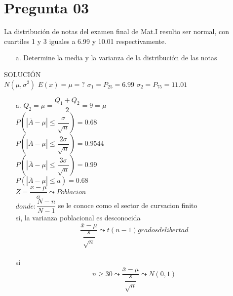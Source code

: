 \documentclass[10pt,a4paper]{article}
\begin{document}
\section{Pregunta 03}
La distribución de notas del examen final de Mat.I resulto ser normal, con cuartiles 1 y 3 iguales a 6.99 y 10.01 respectivamente.\\
\begin{itemize}
\item[a.]Determine la media y la varianza de la distribución de las notas\\
\end{itemize}
SOLUCIÓN\\
\newline
$N(\mu,\sigma^2)$
$E(x)=\mu=?$
$\sigma_{1}=P_{25}= 6.99$
$\sigma_{2}=P_{75}= 11.01$
\begin{itemize}
\item[a.]
$Q_{2}=\mu=\dfrac{Q_{1}+Q_{2}}{2}=9=\mu$\\
\newline
$P(|\overline{A}-\mu| \leq \dfrac{\sigma}{\sqrt{n}}) = 0.68$\\
\newline
$P(|\overline{A}-\mu| \leq \dfrac{2\sigma}{\sqrt{n}}) = 0.9544$\\
\newline
$P(|\overline{A}-\mu| \leq \dfrac{3\sigma}{\sqrt{n}}) = 0.99$\\
\newline
$P(|\overline{A}-\mu| \leq a) = 0.68$\\
\newline
$Z = \dfrac{x-\mu}{\sigma} \leadsto Poblacion$\\
\newline
$donde: \dfrac{N-n}{N-1}$ se le conoce como el sector de curvacion finito\\
si, la varianza poblacional es desconocida\\
$$\dfrac{\overline{x}-\mu}{\dfrac{s}{\sqrt{n}}} \leadsto t(n-1) grados de libertad$$\\
si$$n\geq30 \leadsto \dfrac{\overline{x}-\mu}{\dfrac{s}{\sqrt{n}}} \leadsto N(0,1)$$
\end{itemize} 
\end{document}
